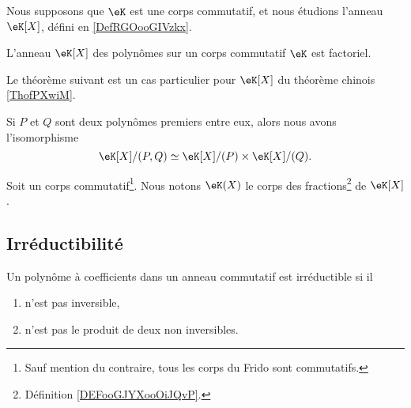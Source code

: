 Nous supposons que \( \eK\) est une corps commutatif, et nous étudions l'anneau \( \eK[X]\), défini en \ref{DefRGOooGIVzkx}.

\begin{proposition}     \label{PropqGZXvr}
    L'anneau \( \eK[X]\) des polynômes sur un corps commutatif \( \eK\) est factoriel.
\end{proposition}

Le théorème suivant est un cas particulier pour \( \eK[X]\) du théorème chinois \ref{ThofPXwiM}.
\begin{theorem}
    Si \( P\) et \( Q\) sont deux polynômes premiers entre eux, alors nous avons l'isomorphisme
    \begin{equation}
        \eK[X]/(P,Q)\simeq\eK[X]/(P)\times \eK[X]/(Q).
    \end{equation}
\end{theorem}


\begin{definition}  \label{DEFooQPZIooQYiNVh}
    Soit un corps commutatif\footnote{Sauf mention du contraire, tous les corps du Frido sont commutatifs.}. Nous notons \( \eK(X)\) le corps des fractions\footnote{Définition \ref{DEFooGJYXooOiJQvP}.} de \( \eK[X]\).
\end{definition}

\subsection{Irréductibilité}

\begin{definition}      \label{DefIrredfIqydS}
    Un polynôme à coefficients dans un anneau commutatif est irréductible si il
\begin{enumerate}
        \item
            n'est pas inversible,
        \item
            n'est pas le produit de deux non inversibles.
    \end{enumerate}
\end{definition}

